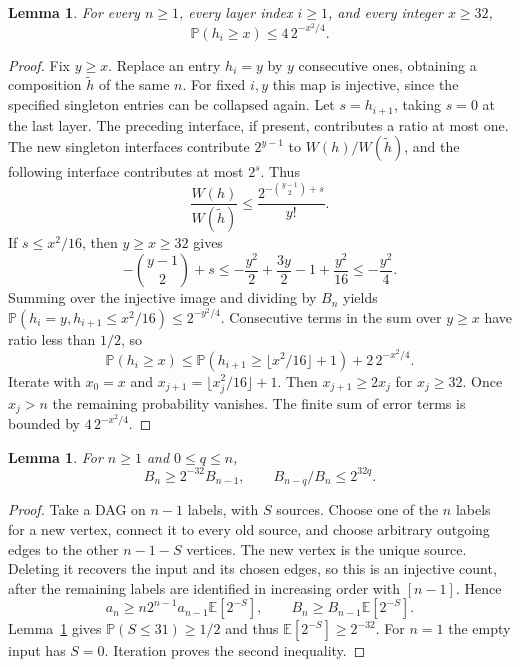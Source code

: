 \documentclass[11pt]{article}
\newtheorem{lemma}[theorem]{Lemma}
\theoremstyle{remark}
\newcommand{\Prob}{\mathbb P}
\newcommand{\E}{\mathbb E}
\begin{document}
\begin{lemma}\label{lem:layer}
For every $n\ge1$, every layer index $i\ge1$, and every integer $x\ge32$,
\begin{equation}\label{eq:layer}
 \Prob(h_i\ge x)\le4\,2^{-x^2/4}.
\end{equation}
\end{lemma}
\begin{proof}
Fix $y\ge x$. Replace an entry $h_i=y$ by $y$ consecutive ones, obtaining
a composition $\widetilde h$ of the same $n$. For fixed $i,y$ this map is
injective, since the specified singleton entries can be collapsed again.
Let $s=h_{i+1}$, taking $s=0$ at the last layer. The preceding interface,
if present, contributes a ratio at most one. The new singleton interfaces
contribute $2^{y-1}$ to $W(h)/W(\widetilde h)$, and the following interface
contributes at most $2^s$. Thus
\[
 \frac{W(h)}{W(\widetilde h)}
 \le\frac{2^{-\binom{y-1}{2}+s}}{y!}.
\]
If $s\le x^2/16$, then $y\ge x\ge32$ gives
\[
 -\binom{y-1}{2}+s
 \le-\frac{y^2}{2}+\frac{3y}{2}-1+\frac{y^2}{16}
 \le-\frac{y^2}{4}.
\]
Summing over the injective image and dividing by $B_n$ yields
$\Prob(h_i=y,h_{i+1}\le x^2/16)\le2^{-y^2/4}$.
Consecutive terms in the sum over $y\ge x$ have ratio less than $1/2$, so
\[
 \Prob(h_i\ge x)
 \le\Prob\left(h_{i+1}\ge\lfloor x^2/16\rfloor+1\right)
       +2\,2^{-x^2/4}.
\]
Iterate with $x_0=x$ and $x_{j+1}=\lfloor x_j^2/16\rfloor+1$.
Then $x_{j+1}\ge2x_j$ for $x_j\ge32$. Once $x_j>n$ the remaining
probability vanishes. The finite sum of error terms is bounded by
$4\,2^{-x^2/4}$.
\end{proof}

\begin{lemma}\label{lem:normalizer}
For $n\ge1$ and $0\le q\le n$,
\begin{equation}\label{eq:normalizer}
 B_n\ge2^{-32}B_{n-1},\qquad B_{n-q}/B_n\le2^{32q}.
\end{equation}
\end{lemma}
\begin{proof}
Take a DAG on $n-1$ labels, with $S$ sources. Choose one of the $n$ labels
for a new vertex, connect it to every old source, and choose arbitrary
outgoing edges to the other $n-1-S$ vertices. The new vertex is the unique
source. Deleting it recovers the input and its chosen edges, so this is an
injective count, after the remaining labels are identified in increasing
order with $[n-1]$. Hence
\[
 a_n\ge n2^{n-1}a_{n-1}\E[2^{-S}],\qquad
 B_n\ge B_{n-1}\E[2^{-S}].
\]
Lemma~\ref{lem:layer} gives $\Prob(S\le31)\ge1/2$ and thus
$\E[2^{-S}]\ge2^{-32}$. For $n=1$ the empty input has $S=0$.
Iteration proves the second inequality.
\end{proof}
\end{document}
